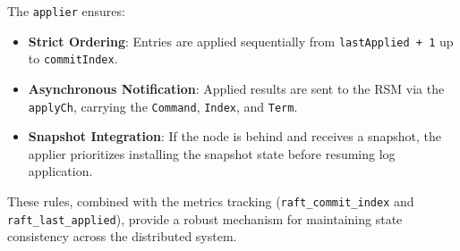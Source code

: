 The \texttt{applier} ensures:
\begin{itemize}
    \item \textbf{Strict Ordering}: Entries are applied sequentially from \texttt{lastApplied + 1} up to \texttt{commitIndex}.
    \item \textbf{Asynchronous Notification}: Applied results are sent to the RSM via the \texttt{applyCh}, carrying the \texttt{Command}, \texttt{Index}, and \texttt{Term}.
    \item \textbf{Snapshot Integration}: If the node is behind and receives a snapshot, the applier prioritizes installing the snapshot state before resuming log application.
\end{itemize}

These rules, combined with the metrics tracking (\texttt{raft\_commit\_index} and \texttt{raft\_last\_applied}), provide a robust mechanism for maintaining state consistency across the distributed system.